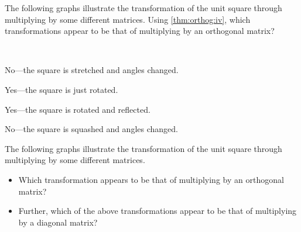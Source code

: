 \begin{example} \label{eg:}
The following graphs illustrate the transformation of the unit square through multiplying by some different matrices. 
Using \autoref{thm:orthog:iv}, which transformations appear to be that of multiplying by an orthogonal matrix?
\begin{parts}
\item {}
\item {}
\item {}
\item {}
\end{parts}

\begin{solution} \ 
\begin{parts}
\item No---the square is stretched and angles changed.
\item Yes---the square is just rotated.
\item Yes---the square is rotated and reflected.
\item No---the square is squashed and angles changed.
\end{parts}
\end{solution}
\end{example}




\begin{activity}
The following graphs illustrate the transformation of the unit square through multiplying by some different matrices. 
\begin{itemize}
\item Which transformation appears to be that of multiplying by an orthogonal matrix?
\actposs{\TwoD{-0.85}{-0.52}{-0.52}{0.85}}
{}
{}
{}
\item Further, which of the above transformations appear to be that of multiplying by a diagonal matrix?
\end{itemize}
\end{activity}





